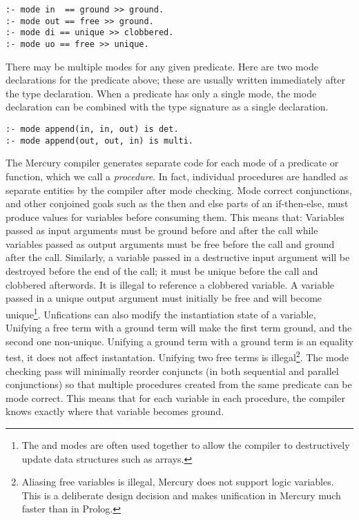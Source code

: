 \begin{verbatim}
:- mode in  == ground >> ground.
:- mode out == free >> ground.
:- mode di == unique >> clobbered.
:- mode uo == free >> unique.
\end{verbatim}

\noindent
There may be multiple modes for any given predicate.
Here are two mode declarations for the  predicate above;
these are usually written immediately after the type declaration.
When a predicate has only a single mode,
the mode declaration can be combined with the type signature as a single
declaration.

\begin{verbatim}
:- mode append(in, in, out) is det.
:- mode append(out, out, in) is multi.
\end{verbatim}

\noindent
The Mercury compiler generates separate code
for each mode of a predicate or function,
which we call a \emph{procedure}.
In fact, individual procedures are handled as separate entities by
the compiler after mode checking.
Mode correct conjunctions,
and other conjoined goals such as the then and else parts of an if-then-else,
must produce values for variables before consuming them.
This means that:
Variables passed as input arguments must be ground before and after the call
while variables passed as output arguments must be free before the call and
ground after the call.
Similarly, a variable passed in a destructive input argument will be destroyed
before the end of the call;
it must be unique before the call and clobbered afterwords.
It is illegal to reference a clobbered variable.
A variable passed in a unique output argument must initially be free and
will become unique\footnote{
    The \di and \uo modes are often used together to allow the compiler to
    destructively update data structures such as arrays.}.
Unfications can also modify the instantiation state of a variable,
Unifying a free term with a ground term will make the first term ground,
and the second one non-unique.
Unifying a ground term with a ground term is an equality test,
it does not affect instantation.
Unifying two free terms is illegal\footnote{
Aliasing free variables is illegal, Mercury does not support logic variables.
This is a deliberate design decision and makes unification in Mercury much
faster than in Prolog.}.
The mode checking pass will minimally reorder conjuncts 
(in both sequential and parallel conjunctions)
so that multiple procedures created from the same predicate can be mode
correct.
This means that for each variable in each procedure,
the compiler knows exactly where that variable becomes ground.

